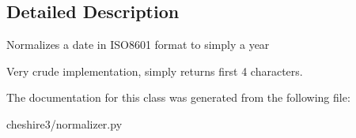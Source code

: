 \subsection{Detailed Description}
\begin{DoxyVerb}Normalizes a date in ISO8601 format to simply a year

Very crude implementation, simply returns first 4 characters.
\end{DoxyVerb}
 

The documentation for this class was generated from the following file\-:\begin{DoxyCompactItemize}
\item 
cheshire3/normalizer.\-py\end{DoxyCompactItemize}
